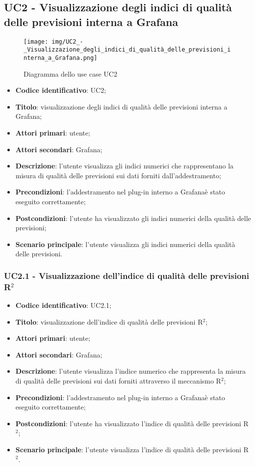 \subsection{UC2 - Visualizzazione degli indici di qualità delle previsioni interna a Grafana}
\begin{figure}[H]
\texttt{[image: img/UC2\_-\_Visualizzazione\_degli\_indici\_di\_qualità\_delle\_previsioni\_interna\_a\_Grafana.png]}
\caption{Diagramma dello use case UC2}
\end{figure}
\begin{itemize}
	\item \textbf{Codice identificativo}: UC2;
	\item \textbf{Titolo}: visualizzazione degli indici di qualità delle previsioni interna a Grafana;
	\item \textbf{Attori primari}: utente;
	\item \textbf{Attori secondari}: Grafana\glo;
	\item \textbf{Descrizione}: l'utente visualizza gli indici numerici che rappresentano la misura di qualità delle previsioni sui dati forniti dall'addestramento;
	\item \textbf{Precondizioni}: l'addestramento nel plug-in interno a Grafana\glosp è stato eseguito correttamente;
	\item \textbf{Postcondizioni}: l'utente ha visualizzato gli indici numerici della qualità delle previsioni;
	\item \textbf{Scenario principale}: l'utente visualizza gli indici numerici della qualità delle previsioni.
\end{itemize}
\subsubsection{UC2.1 - Visualizzazione dell'indice di qualità delle previsioni R$^{2}$}
\begin{itemize}
	\item \textbf{Codice identificativo}: UC2.1;
	\item \textbf{Titolo}: visualizzazione dell'indice di qualità delle previsioni R$^{2}$\glo;
	\item \textbf{Attori primari}: utente;
	\item \textbf{Attori secondari}: Grafana\glo;
	\item \textbf{Descrizione}: l'utente visualizza l'indice numerico che rappresenta la misura di qualità delle previsioni sui dati forniti attraverso il meccanismo R$^{2}$\glo;
	\item \textbf{Precondizioni}: l'addestramento nel plug-in interno a Grafana\glosp è stato eseguito correttamente;
	\item \textbf{Postcondizioni}: l'utente ha visualizzato l'indice di qualità delle previsioni R$^{2}$\glo;
	\item \textbf{Scenario principale}: l'utente visualizza l'indice di qualità delle previsioni R$^{2}$\glo.
\end{itemize} 
